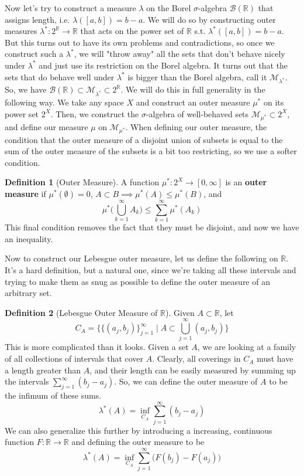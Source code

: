 \documentclass{article}
\theoremstyle{remark}
\theoremstyle{definition}
\newtheorem{definition}{Definition}[section]
\begin{document}
Now let's try to construct a measure $\lambda$ on the Borel $\sigma$-algebra $\mathcal{B}(\mathbb{R})$ that assigns length, i.e. $\lambda([a, b]) = b - a$. We will do so by constructing outer measures $\lambda^*: 2^\mathbb{R} \longrightarrow \mathbb{R}$ that acts on the power set of $\mathbb{R}$ s.t. $\lambda^*([a, b]) = b - a$. But this turns out to have its own problems and contradictions, so once we construct such a $\lambda^*$, we will "throw away" all the sets that don't behave nicely under $\lambda^*$ and just use its restriction on the Borel algebra. It turns out that the sets that do behave well under $\lambda^*$ is bigger than the Borel algebra, call it $\mathcal{M}_{\lambda^*}$. So, we have $\mathcal{B}(\mathbb{R}) \subset \mathcal{M}_{\lambda^*} \subset 2^\mathbb{R}$. We will do this in full generality in the following way. We take any space $X$ and construct an outer measure $\mu^*$ on its power set $2^X$. Then, we construct the $\sigma$-algebra of well-behaved sets $\mathcal{M}_{\mu^*} \subset 2^X$, and define our measure $\mu$ on $\mathcal{M}_{\mu^*}$. When defining our outer measure, the condition that the outer measure of a disjoint union of subsets is equal to the sum of the outer measure of the subsets is a bit too restricting, so we use a softer condition. 

\begin{definition}[Outer Measure]
A function $\mu^* : 2^X \longrightarrow [0, \infty]$ is an \textbf{outer measure} if $\mu^*(\emptyset) = 0$, $A \subset B \implies \mu^* (A) \leq \mu^*(B)$, and 
\[\mu^* \bigg( \bigcup_{k=1}^\infty A_k \bigg) \leq \sum_{k=1}^\infty \mu^* (A_k)\]
This final condition removes the fact that they must be disjoint, and now we have an inequality. 
\end{definition}

Now to construct our Lebesgue outer measure, let us define the following on $\mathbb{R}$. It's a hard definition, but a natural one, since we're taking all these intervals and trying to make them as snug as possible to define the outer measure of an arbitrary set. 

\begin{definition}[Lebesgue Outer Measure of $\mathbb{R}$]
Given $A \subset \mathbb{R}$, let 
\[C_A = \big\{ \{(a_j, b_j)\}_{j=1}^\infty \mid A \subset \bigcup_{j=1}^\infty (a_j, b_j) \big\}\]
This is more complicated than it looks. Given a set $A$, we are looking at a family of all collections of intervals that cover $A$. Clearly, all coverings in $C_A$ must have a length greater than $A$, and their length can be easily measured by summing up the intervals $\sum_{j=1}^\infty (b_j - a_j)$. So, we can define the outer measure of $A$ to be the infimum of these sums. 
\[\lambda^*(A) = \inf_{C_A} \sum_{j=1}^\infty (b_j - a_j)\]
We can also generalize this further by introducing a increasing, continuous function $F: \mathbb{R} \rightarrow \mathbb{R}$ and defining the outer measure to be 
\[\lambda^*(A) = \inf_{C_A} \sum_{j=1}^\infty \big( F(b_j) - F(a_j) \big) \]
\end{definition}
\end{document}
